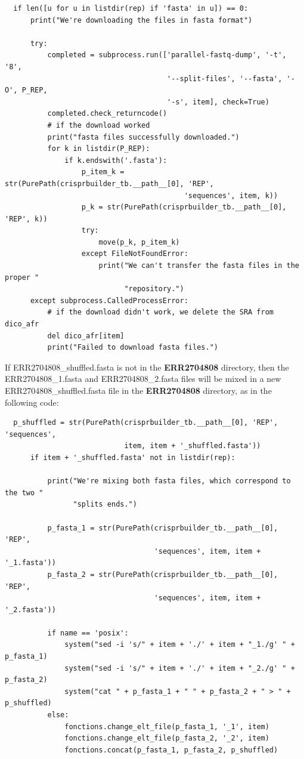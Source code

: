 \documentclass[twoside,a4paper,11pt,frenchb,openany]{report}
\begin{document}
\begin{verbatim}
  if len([u for u in listdir(rep) if 'fasta' in u]) == 0:
      print("We're downloading the files in fasta format")

      try:
          completed = subprocess.run(['parallel-fastq-dump', '-t', '8',
                                      '--split-files', '--fasta', '-O', P_REP,
                                      '-s', item], check=True)
          completed.check_returncode()
          # if the download worked
          print("fasta files successfully downloaded.")
          for k in listdir(P_REP):
              if k.endswith('.fasta'):
                  p_item_k = str(PurePath(crisprbuilder_tb.__path__[0], 'REP',
                                          'sequences', item, k))
                  p_k = str(PurePath(crisprbuilder_tb.__path__[0], 'REP', k))
                  try:
                      move(p_k, p_item_k)
                  except FileNotFoundError:
                      print("We can't transfer the fasta files in the proper "
                            "repository.")
      except subprocess.CalledProcessError:
          # if the download didn't work, we delete the SRA from dico_afr
          del dico_afr[item]
          print("Failed to download fasta files.")
\end{verbatim}

    If ERR2704808\_shuffled.fasta is not in the \textbf{ERR2704808}
directory, then the ERR2704808\_1.fasta and ERR2704808\_2.fasta files
will be mixed in a new ERR2704808\_shuffled.fasta file in the
\textbf{ERR2704808} directory, as in the following code:

\begin{verbatim}
  p_shuffled = str(PurePath(crisprbuilder_tb.__path__[0], 'REP', 'sequences',
                            item, item + '_shuffled.fasta'))
      if item + '_shuffled.fasta' not in listdir(rep):

          print("We're mixing both fasta files, which correspond to the two "
                "splits ends.")

          p_fasta_1 = str(PurePath(crisprbuilder_tb.__path__[0], 'REP',
                                   'sequences', item, item + '_1.fasta'))
          p_fasta_2 = str(PurePath(crisprbuilder_tb.__path__[0], 'REP',
                                   'sequences', item, item + '_2.fasta'))

          if name == 'posix':
              system("sed -i 's/" + item + './' + item + "_1./g' " + p_fasta_1)
              system("sed -i 's/" + item + './' + item + "_2./g' " + p_fasta_2)
              system("cat " + p_fasta_1 + " " + p_fasta_2 + " > " + p_shuffled)
          else:
              fonctions.change_elt_file(p_fasta_1, '_1', item)
              fonctions.change_elt_file(p_fasta_2, '_2', item)
              fonctions.concat(p_fasta_1, p_fasta_2, p_shuffled)
\end{verbatim}
\end{document}
